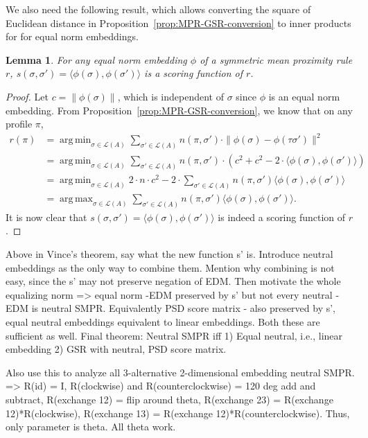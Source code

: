 \documentclass[10pt,letterpaper]{article}
\newcommand{\calL}{{\mathcal{L}}}
\newcommand{\rank}{{\calL(A)}}
\DeclareMathOperator*{\argmax}{arg\,max}
\DeclareMathOperator*{\argmin}{arg\,min}
\newtheorem{lemma}{Lemma}
\begin{document}
We also need the following result, which allows converting the square of Euclidean distance in Proposition~\ref{prop:MPR-GSR-conversion} to inner products for for equal norm embeddings.
\begin{lemma}
For any equal norm embedding $\phi$ of a symmetric mean proximity rule $r$, $s(\sigma,\sigma') = \langle \phi(\sigma),\phi(\sigma') \rangle$ is a scoring function of $r$.
\label{lem:inner-product}
\end{lemma}
\begin{proof}
Let $c = \|\phi(\sigma)\|$, which is independent of $\sigma$ since $\phi$ is an equal norm embedding. From Proposition~\ref{prop:MPR-GSR-conversion}, we know that on any profile $\pi$, 
\begin{align*}
r(\pi) &= \argmin_{\sigma \in \rank} \sum_{\sigma' \in \rank} n(\pi,\sigma') \cdot \|\phi(\sigma)-\phi(\tau \sigma')\|^2 \\
&= \argmin_{\sigma \in \rank} \sum_{\sigma' \in \rank} n(\pi,\sigma') \cdot \left( c^2 + c^2 - 2 \cdot \langle \phi(\sigma), \phi(\sigma')\rangle\right) \\
&= \argmin_{\sigma \in \rank} 2 \cdot n \cdot c^2 - 2 \cdot \sum_{\sigma' \in \rank} n(\pi,\sigma') \langle \phi(\sigma), \phi(\sigma')\rangle \\
&= \argmax_{\sigma \in \rank} \sum_{\sigma' \in \rank} n(\pi,\sigma') \langle \phi(\sigma), \phi(\sigma')\rangle.
\end{align*}
It is now clear that $s(\sigma,\sigma') = \langle \phi(\sigma),\phi(\sigma') \rangle$ is indeed a scoring function of $r$.
\end{proof}


Above in Vince's theorem, say what the new function s' is. Introduce neutral embeddings as the only way to combine them. Mention why combining is not easy, since the s' may not preserve negation of EDM. Then motivate the whole equalizing norm => equal norm -EDM preserved by s' but not every neutral -EDM is neutral SMPR. Equivalently PSD score matrix - also preserved by s', equal neutral embeddings equivalent to linear embeddings. Both these are sufficient as well. Final theorem:
Neutral SMPR iff
1) Equal neutral, i.e., linear embedding
2) GSR with neutral, PSD score matrix.

Also use this to analyze all 3-alternative 2-dimensional embedding neutral SMPR. => R(id) = I, R(clockwise) and R(counterclockwise) = 120 deg add and subtract, R(exchange 12) = flip around theta, R(exchange 23) = R(exchange 12)*R(clockwise), R(exchange 13) = R(exchange 12)*R(counterclockwise). Thus, only parameter is theta. All theta work.
\end{document}
